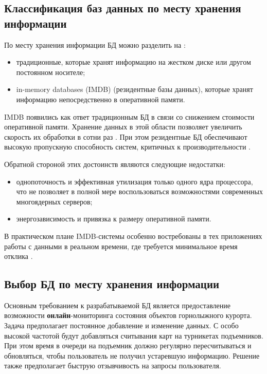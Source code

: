 \clearpage
\subsection{Классификация баз данных по месту хранения информации}

По месту хранения информации БД можно разделить на \cite{inmemory}:
\begin{itemize}
	\item традиционные, которые хранят информацию на жестком диске или другом постоянном носителе; 
	\item in-memory databases (IMDB) (резидентные базы данных), которые хранят информацию непосредственно в оперативной памяти.
\end{itemize}

IMDB появились как ответ традиционным БД в связи со снижением стоимости оперативной памяти. Хранение данных в этой области позволяет увеличить скорость их обработки в сотни раз \cite{why}. При этом резидентные БД обеспечивают высокую пропускную способность систем, критичных к производительности \cite{adv}.

Обратной стороной этих достоинств являются следующие недостатки:
\begin{itemize}
	\item однопоточность и эффективная утилизация только одного ядра процессора, что не позволяет в полной мере воспользоваться возможностями современных многоядерных серверов;
	\item энергозависимость и привязка к размеру оперативной памяти.
\end{itemize}

В практическом плане IMDB-системы особенно востребованы в тех приложениях работы с данными в реальном времени, где требуется минимальное время отклика \cite{lookslike}.

\subsection{Выбор БД по месту хранения информации}\label{imdb}
Основным требованием к разрабатываемой БД является предоставление возможности \textbf{онлайн}-мониторинга состояния объектов горнолыжного курорта. Задача предполагает постоянное добавление и изменение данных. С особо высокой частотой будут добавляться считывания карт на турникетах подъемников. При этом время в очереди на подъемник должно регулярно пересчитываться и обновляться, чтобы пользователь не получил устаревшую информацию. Решение также предполагает быструю отзывчивость на запросы пользователя.  

